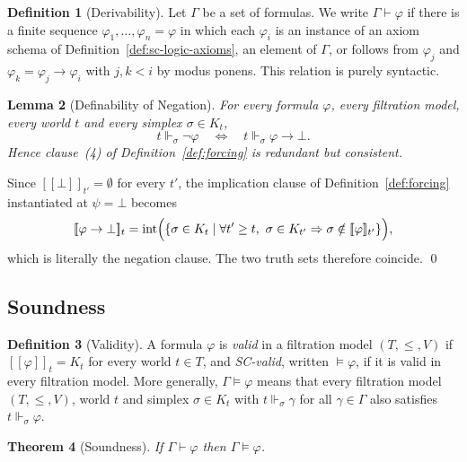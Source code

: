 \documentclass[final,12pt]{elsarticle}
\newcommand{\llbracket}{[\![}
\newcommand{\rrbracket}{]\!]}
\theoremstyle{plain}
\newtheorem{thm}{Theorem}[section]
\newtheorem{lem}[thm]{Lemma}
\theoremstyle{definition}
\newtheorem{defi}[thm]{Definition}
\begin{document}
\begin{defi}[Derivability]
\label{def:derivability}
Let \(\Gamma\) be a set of formulas. We write \(\Gamma \vdash \varphi\) if there is
a finite sequence \(\varphi_1, \dots, \varphi_n = \varphi\) in which each
\(\varphi_i\) is an instance of an axiom schema of
Definition~\ref{def:sc-logic-axioms}, an element of \(\Gamma\), or follows from
\(\varphi_j\) and \(\varphi_k = \varphi_j \to \varphi_i\) with \(j,k < i\) by modus
ponens. This relation is purely syntactic.
\end{defi}

\begin{lem}[Definability of Negation]
\label{lem:negation-definable}
For every formula \(\varphi\), every filtration model, every world \(t\) and every
simplex \(\sigma \in K_t\),
\[
  t \Vdash_\sigma \neg\varphi
  \quad\Longleftrightarrow\quad
  t \Vdash_\sigma \varphi \to \bot .
\]
Hence clause~(4) of Definition~\ref{def:forcing} is redundant but consistent.
\end{lem}

\proof
Since \(\llbracket \bot \rrbracket_{t'} = \emptyset\) for every \(t'\), the
implication clause of Definition~\ref{def:forcing} instantiated at \(\psi = \bot\)
becomes
\[
  \llbracket \varphi \to \bot \rrbracket_t
  = \mathrm{int}\Bigl(\{\sigma \in K_t \mid \forall t' \ge t,\ \sigma \in K_{t'}
    \Rightarrow \sigma \notin \llbracket \varphi \rrbracket_{t'}\}\Bigr),
\]
which is literally the negation clause. The two truth sets therefore coincide.
\qed

\subsection{Soundness}
\label{subsec:soundness}

\begin{defi}[Validity]
\label{def:validity}
A formula \(\varphi\) is \emph{valid} in a filtration model \((T,\le,V)\) if
\(\llbracket \varphi \rrbracket_t = K_t\) for every world \(t \in T\), and
\emph{SC-valid}, written \(\vDash \varphi\), if it is valid in every filtration
model. More generally, \(\Gamma \vDash \varphi\) means that every filtration model
\((T,\le,V)\), world \(t\) and simplex \(\sigma \in K_t\) with
\(t \Vdash_\sigma \gamma\) for all \(\gamma \in \Gamma\) also satisfies
\(t \Vdash_\sigma \varphi\).
\end{defi}



\begin{thm}[Soundness]
\label{thm:soundness}
If \(\Gamma \vdash \varphi\) then \(\Gamma \vDash \varphi\).
\end{thm}
\end{document}
